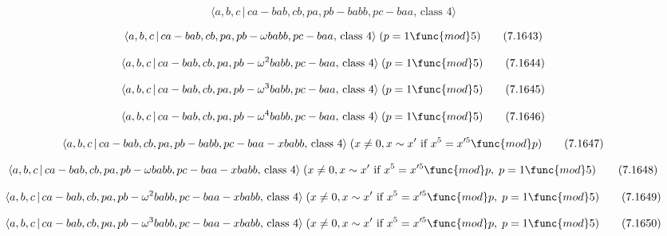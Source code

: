 \documentclass[10pt]{article}
\begin{document}
\begin{equation}
\langle a,b,c\,|\,ca-bab,cb,pa,pb-babb,pc-baa,\,\text{class }4\rangle 
\tag{7.1642}
\end{equation}

\begin{equation}
\langle a,b,c\,|\,ca-bab,cb,pa,pb-\omega babb,pc-baa,\,\text{class }4\rangle
\;(p=1\func{mod}5)  \tag{7.1643}
\end{equation}

\begin{equation}
\langle a,b,c\,|\,ca-bab,cb,pa,pb-\omega ^{2}babb,pc-baa,\,\text{class }%
4\rangle \;(p=1\func{mod}5)  \tag{7.1644}
\end{equation}

\begin{equation}
\langle a,b,c\,|\,ca-bab,cb,pa,pb-\omega ^{3}babb,pc-baa,\,\text{class }%
4\rangle \;(p=1\func{mod}5)  \tag{7.1645}
\end{equation}

\begin{equation}
\langle a,b,c\,|\,ca-bab,cb,pa,pb-\omega ^{4}babb,pc-baa,\,\text{class }%
4\rangle \;(p=1\func{mod}5)  \tag{7.1646}
\end{equation}

\begin{equation}
\langle a,b,c\,|\,ca-bab,cb,pa,pb-babb,pc-baa-xbabb,\,\text{class }4\rangle
\;(x \neq 0, x \sim x^{\prime}\text{ if }x^5=x^{\prime 5 }\func{mod} p) 
\tag{7.1647}
\end{equation}

\begin{equation}
\langle a,b,c\,|\,ca-bab,cb,pa,pb-\omega babb,pc-baa-xbabb,\,\text{class }%
4\rangle \;(x\neq 0,x \sim x^{\prime}\text{ if }x^5=x^{\prime 5}\func{mod}%
p,\;p=1\func{mod}5)  \tag{7.1648}
\end{equation}

\begin{equation}
\langle a,b,c\,|\,ca-bab,cb,pa,pb-\omega ^{2}babb,pc-baa-xbabb,\,\text{class 
}4\rangle \;(x\neq 0,x \sim x^{\prime}\text{ if }x^5=x^{\prime 5}\func{mod}%
p,\;p=1\func{mod}5)  \tag{7.1649}
\end{equation}

\begin{equation}
\langle a,b,c\,|\,ca-bab,cb,pa,pb-\omega ^{3}babb,pc-baa-xbabb,\,\text{class 
}4\rangle \;(x\neq 0,x \sim x^{\prime}\text{ if }x^5=x^{\prime 5}\func{mod}%
p,\;p=1\func{mod}5)  \tag{7.1650}
\end{equation}
\end{document}
